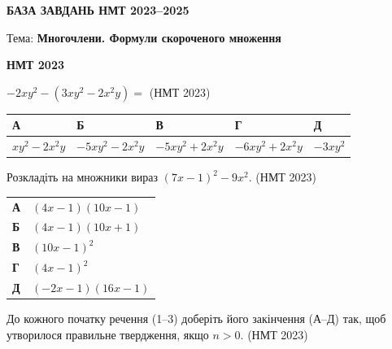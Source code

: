\documentclass[14pt]{extarticle}
\newcommand{\answerTable}[5]{
\begin{center}
\begin{tabular}{|*{5}{>{\centering\arraybackslash}m{2.8cm}|}}
\hline
\rule[-0.3cm]{0pt}{0.8cm}\textbf{А} & \textbf{Б} & \textbf{В} & \textbf{Г} & \textbf{Д} \\
\hline
\rule[-0.4cm]{0pt}{1.0cm}#1 & \rule[-0.4cm]{0pt}{1.0cm}#2 & \rule[-0.4cm]{0pt}{1.0cm}#3 & \rule[-0.4cm]{0pt}{1.0cm}#4 & \rule[-0.4cm]{0pt}{1.0cm}#5 \\
\hline
\end{tabular}
\end{center}
}
\newcommand{\task}[2]{\noindent\makebox[1.5em][l]{\textbf{#1.}}\parbox[t]{\dimexpr\textwidth-1.5em}{#2}}
\newcommand{\nmtyear}[1]{\hfill{\small\color{yearcolor}(НМТ #1)}}
\begin{document}
\begin{center}
{\Large\textbf{\color{headerblue}БАЗА ЗАВДАНЬ НМТ 2023--2025}}
\end{center}

\begin{center}
{\large Тема: \textbf{Многочлени. Формули скороченого множення}}
\end{center}

\vspace{0.5cm}


\begin{center}
{\Large\textbf{\color{headerblue}НМТ 2023}}
\end{center}

\vspace{0.5cm}

\task{1}{$-2xy^2 - (3xy^2 - 2x^2y) =$ \nmtyear{2023}}
\answerTable{$xy^2 - 2x^2y$}{$-5xy^2 - 2x^2y$}{$-5xy^2 + 2x^2y$}{$-6xy^2 + 2x^2y$}{$-3xy^2$}

\vspace{0.5cm}

\task{2}{Розкладіть на множники вираз $(7x - 1)^2 - 9x^2$. \nmtyear{2023}}

\vspace{0.2cm}
\begin{tabular}{ll}
\textbf{А} & $(4x - 1)(10x - 1)$ \\
\textbf{Б} & $(4x - 1)(10x + 1)$ \\
\textbf{В} & $(10x - 1)^2$ \\
\textbf{Г} & $(4x - 1)^2$ \\
\textbf{Д} & $(-2x - 1)(16x - 1)$ \\
\end{tabular}

\vspace{0.7cm}

\task{3}{До кожного початку речення (1--3) доберіть його закінчення (А--Д) так, щоб утворилося правильне твердження, якщо $n > 0$. \nmtyear{2023}}
\end{document}
